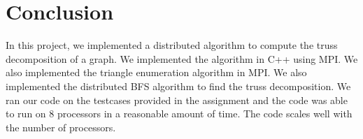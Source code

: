 \documentclass{article}
\begin{document}
\section{Conclusion}

In this project, we implemented a distributed algorithm to compute the truss decomposition of a graph. We implemented the algorithm in C++ using MPI. We also implemented the triangle enumeration algorithm in MPI. We also implemented the distributed BFS algorithm to find the truss decomposition. We ran our code on the testcases provided in the assignment and the code was able to run on 8 processors in a reasonable amount of time. The code scales well with the number of processors.
\end{document}
